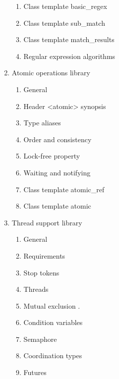 \begin{enumerate}
\begin{enumerate}[label=\arabic{enumi}.\arabic*.]
      \item  Class template basic\_regex 
      \item  Class template sub\_match 
      \item  Class template match\_results 
      \item  Regular expression algorithms
     \end{enumerate}
\item Atomic operations library
    \begin{enumerate}[label=\arabic{enumi}.\arabic*.]
      \item General 
      \item Header <atomic> synopsis 
      \item Type aliases 
      \item Order and consistency 
      \item Lock-free property 
      \item Waiting and notifying 
      \item Class template atomic\_ref
      \item Class template atomic
     \end{enumerate}
\item Thread support library
    \begin{enumerate}[label=\arabic{enumi}.\arabic*.]
      \item General 
      \item Requirements 
      \item Stop tokens 
      \item Threads 
      \item Mutual exclusion .
      \item Condition variables 
      \item Semaphore 
      \item Coordination types 
      \item Futures
     \end{enumerate}
\end{enumerate}  


















    
      
      
      
      
      
      
      